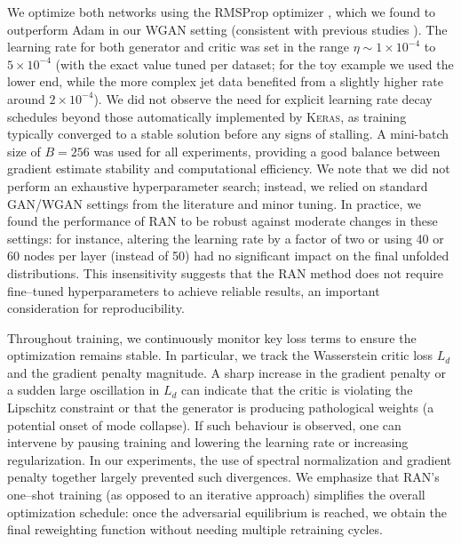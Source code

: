         We optimize both networks using the RMSProp optimizer , which we found to outperform Adam in our WGAN setting (consistent with previous studies ).
        The learning rate for both generator and critic was set in the range $\eta \sim 1\times10^{-4}$ to $5\times10^{-4}$ (with the exact value tuned per dataset; for the toy example we used the lower end, while the more complex jet data benefited from a slightly higher rate around $2\times10^{-4}$).
        We did not observe the need for explicit learning rate decay schedules beyond those automatically implemented by \textsc{Keras},\kd{} as training typically converged to a stable solution before any signs of stalling.
        A mini-batch size of $B=256$ was used for all experiments, providing a good balance between gradient estimate stability and computational efficiency.
        We note that we did not perform an exhaustive hyperparameter search; instead, we relied on standard GAN/WGAN settings from the literature and minor tuning.
        In practice, we found the performance of RAN to be robust against moderate changes in these settings: for instance, altering the learning rate by a factor of two or using 40 or 60 nodes per layer (instead of 50) had no significant impact on the final unfolded distributions.
        This insensitivity suggests that the RAN method does not require fine--tuned hyperparameters to achieve reliable results, an important consideration for reproducibility.
    
        Throughout training, we continuously monitor key loss terms to ensure the optimization remains stable.
        In particular, we track the Wasserstein critic loss $L_d$ and the gradient penalty magnitude.
        A sharp increase in the gradient penalty or a sudden large oscillation in $L_d$ can indicate that the critic is violating the Lipschitz constraint or that the generator is producing pathological weights (a potential onset of mode collapse).
        If such behaviour is observed, one can intervene by pausing training and lowering the learning rate or increasing regularization.
        In our experiments, the use of spectral normalization and gradient penalty together largely prevented such divergences.
        We emphasize that RAN’s one--shot training (as opposed to an iterative approach) simplifies the overall optimization schedule: once the adversarial equilibrium is reached, we obtain the final reweighting function without needing multiple retraining cycles.
    
